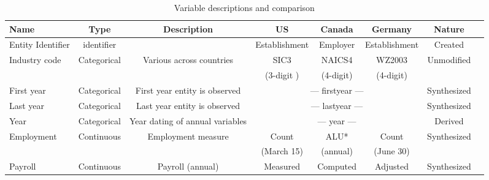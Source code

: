 \begin{table}[H]
  \centering\footnotesize
  \caption{Variable descriptions and comparison}  \label{tab:common_Variable} \medskip
  \renewcommand{\arraystretch}{1}
 \setlength{\tabcolsep}{4.5pt}
 \begin{tabular}{l  c c c c c c c}
    \toprule
    \textbf{Name}&\textbf{Type} &\textbf{Description} &\textbf{US} & \textbf{Canada} &\textbf{Germany} &\textbf{Nature}\\
    \midrule
Entity Identifier& identifier& & Establishment & Employer & Establishment &Created\\
Industry code&Categorical& Various across countries &SIC3 & NAICS4 & WZ2003 &Unmodified\\
             &           &                          &(3-digit )& (4-digit) &(4-digit)  &\\
First year&Categorical&First year entity is observed &\multicolumn{3}{c}{--- firstyear ---}&Synthesized\\
Last year&Categorical&Last year entity is observed &\multicolumn{3}{c}{--- lastyear ---}&Synthesized\\
Year&Categorical&Year dating of annual variables&\multicolumn{3}{c}{--- year ---}&Derived\\
Employment & Continuous & Employment measure & Count & ALU* & Count & Synthesized \\
            &            &                    & (March 15) &(annual)& (June 30)&\\
Payroll&Continuous&  Payroll (annual)& Measured & Computed & Adjusted &Synthesized\\
   \bottomrule
  \end{tabular} 
\end{table}